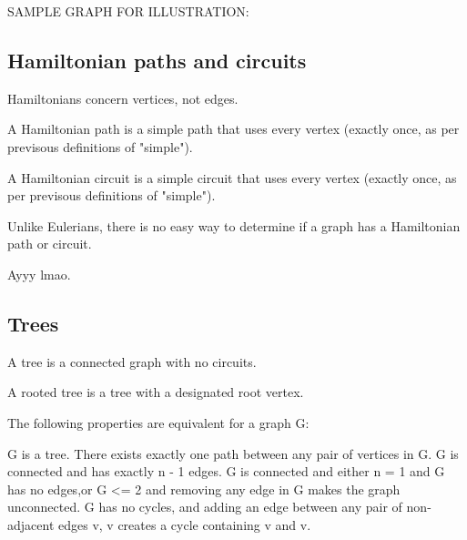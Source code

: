 \documentclass{article}
\begin{document}
SAMPLE GRAPH FOR ILLUSTRATION:


\subsection{Hamiltonian paths and circuits}

Hamiltonians concern vertices, not edges.

A Hamiltonian path is a simple path that uses every vertex (exactly once, as per previsous definitions of "simple").

A Hamiltonian circuit is a simple circuit that uses every vertex (exactly once, as per previsous definitions of "simple").


Unlike Eulerians, there is no easy way to determine if a graph has a Hamiltonian path or circuit.

Ayyy lmao.

\subsection{Trees}

A tree is a connected graph with no circuits.

A rooted tree is a tree with a designated root vertex.

The following properties are equivalent for a graph G:

\begin{outline}
    \1 G is a tree.
    \1 There exists exactly one path between any pair of vertices in G.
    \1 G is connected and has exactly n - 1 edges.
    \1 G is connected and either n = 1 and G has no edges,or G <= 2 and removing any edge in G makes the graph unconnected.
    \1 G has no cycles, and adding an edge between any pair of non-adjacent edges v, v creates a cycle containing v and v.

\end{outline}
\end{document}
